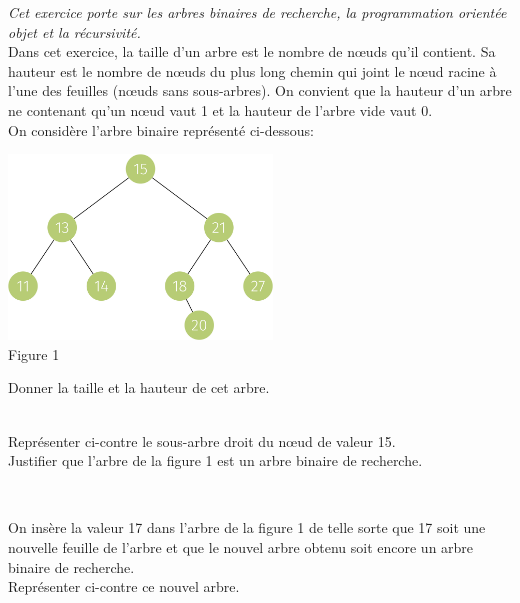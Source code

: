 \documentclass[a4paper,12pt,article,firamath]{nsi}
\begin{document}
\resetquestion
\textit{Cet exercice porte sur les arbres binaires de recherche, la programmation orientée
    objet et la récursivité.}\\

Dans cet exercice, la taille d'un arbre est le nombre de nœuds qu'il contient. Sa hauteur
est le nombre de nœuds du plus long chemin qui joint le nœud racine à l'une des
feuilles (nœuds sans sous-arbres). On convient que la hauteur d'un arbre ne contenant
qu'un nœud vaut 1 et la hauteur de l'arbre vide vaut 0.\\

On considère l'arbre binaire représenté ci-dessous:
\begin{center}
    \includegraphics[width=7cm]{img/fig1.png}\\
    Figure 1
\end{center}
Donner la taille et la hauteur de cet arbre.\\

\\

\dleft{7cm}
{
}{\question Représenter ci-contre le sous-arbre droit du n\oe ud de valeur 15.\\

    \question Justifier que l'arbre de la figure 1 est un arbre binaire de recherche.
}



\\

\dleft{7cm}
{
}{
    On insère la valeur 17 dans l'arbre de la figure 1 de telle sorte que 17 soit une
    nouvelle feuille de l'arbre et que le nouvel arbre obtenu soit encore un arbre
    binaire de recherche.\\

    \question Représenter ci-contre ce nouvel arbre.
}
\end{document}

